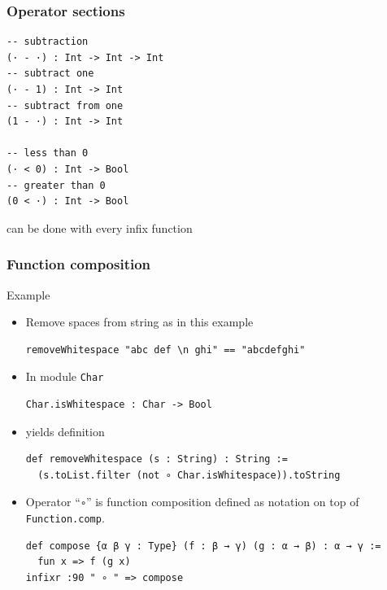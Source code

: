 \documentclass{beamer}
\begin{document}
\begin{frame}[fragile]
  \frametitle{Operator sections}
\begin{lstlisting}
-- subtraction
(· - ·) : Int -> Int -> Int
-- subtract one
(· - 1) : Int -> Int
-- subtract from one
(1 - ·) : Int -> Int

-- less than 0
(· < 0) : Int -> Bool
-- greater than 0
(0 < ·) : Int -> Bool
\end{lstlisting}
  can be done with every infix function
\end{frame}
\begin{frame}[fragile]
  \frametitle{Function composition}
  \begin{block}{Example}
    \begin{itemize}
    \item<+-> Remove spaces from string as in this
      example
\begin{lstlisting}
removeWhitespace "abc def \n ghi" == "abcdefghi"
\end{lstlisting}
    \item<+-> In module \texttt{Char}
\begin{lstlisting}
Char.isWhitespace : Char -> Bool
\end{lstlisting}
    \item<+-> yields definition
\begin{lstlisting}
def removeWhitespace (s : String) : String :=
  (s.toList.filter (not ∘ Char.isWhitespace)).toString
\end{lstlisting}
    \item<+-> Operator ``\lstinline{∘}'' is function composition defined as
      notation on top of \lstinline{Function.comp}.
\begin{lstlisting}
def compose {α β γ : Type} (f : β → γ) (g : α → β) : α → γ :=
  fun x => f (g x)
infixr :90 " ∘ " => compose
\end{lstlisting}
    \end{itemize}
  \end{block}
\end{frame}
\end{document}
